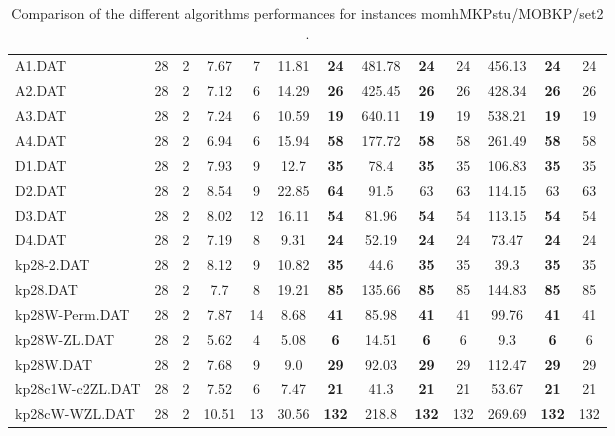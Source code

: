 \begin{table}[h]
{\begin{tabular}{lcccccccccccc}
A1.DAT & 28 & 2 &  \textcolor{blue2}{7.67} & 7 & 11.81 &  \textbf{24} & 481.78 &  \textbf{24} & 24 & 456.13 &  \textbf{24} & 24 \\
A2.DAT & 28 & 2 &  \textcolor{blue2}{7.12} & 6 & 14.29 &  \textbf{26} & 425.45 &  \textbf{26} & 26 & 428.34 &  \textbf{26} & 26 \\
A3.DAT & 28 & 2 &  \textcolor{blue2}{7.24} & 6 & 10.59 &  \textbf{19} & 640.11 &  \textbf{19} & 19 & 538.21 &  \textbf{19} & 19 \\
A4.DAT & 28 & 2 &  \textcolor{blue2}{6.94} & 6 & 15.94 &  \textbf{58} & 177.72 &  \textbf{58} & 58 & 261.49 &  \textbf{58} & 58 \\
D1.DAT & 28 & 2 &  \textcolor{blue2}{7.93} & 9 & 12.7 &  \textbf{35} & 78.4 &  \textbf{35} & 35 & 106.83 &  \textbf{35} & 35 \\
D2.DAT & 28 & 2 &  \textcolor{blue2}{8.54} & 9 & 22.85 &  \textbf{64} & 91.5 & 63 & 63 & 114.15 & 63 & 63 \\
D3.DAT & 28 & 2 &  \textcolor{blue2}{8.02} & 12 & 16.11 &  \textbf{54} & 81.96 &  \textbf{54} & 54 & 113.15 &  \textbf{54} & 54 \\
D4.DAT & 28 & 2 &  \textcolor{blue2}{7.19} & 8 & 9.31 &  \textbf{24} & 52.19 &  \textbf{24} & 24 & 73.47 &  \textbf{24} & 24 \\
kp28-2.DAT & 28 & 2 &  \textcolor{blue2}{8.12} & 9 & 10.82 &  \textbf{35} & 44.6 &  \textbf{35} & 35 & 39.3 &  \textbf{35} & 35 \\
kp28.DAT & 28 & 2 &  \textcolor{blue2}{7.7} & 8 & 19.21 &  \textbf{85} & 135.66 &  \textbf{85} & 85 & 144.83 &  \textbf{85} & 85 \\
kp28W-Perm.DAT & 28 & 2 &  \textcolor{blue2}{7.87} & 14 & 8.68 &  \textbf{41} & 85.98 &  \textbf{41} & 41 & 99.76 &  \textbf{41} & 41 \\
kp28W-ZL.DAT & 28 & 2 & 5.62 & 4 &  \textcolor{blue2}{5.08} &  \textbf{6} & 14.51 &  \textbf{6} & 6 & 9.3 &  \textbf{6} & 6 \\
kp28W.DAT & 28 & 2 &  \textcolor{blue2}{7.68} & 9 & 9.0 &  \textbf{29} & 92.03 &  \textbf{29} & 29 & 112.47 &  \textbf{29} & 29 \\
kp28c1W-c2ZL.DAT & 28 & 2 & 7.52 & 6 &  \textcolor{blue2}{7.47} &  \textbf{21} & 41.3 &  \textbf{21} & 21 & 53.67 &  \textbf{21} & 21 \\
kp28cW-WZL.DAT & 28 & 2 &  \textcolor{blue2}{10.51} & 13 & 30.56 &  \textbf{132} & 218.8 &  \textbf{132} & 132 & 269.69 &  \textbf{132} & 132 \\
\bottomrule
\end{tabular}
}%
\caption{Comparison of the different algorithms performances for instances momhMKPstu/MOBKP/set2 .}
\label{tab:table_compare_momhMKPstu/MOBKP/set2 }
\end{table}
